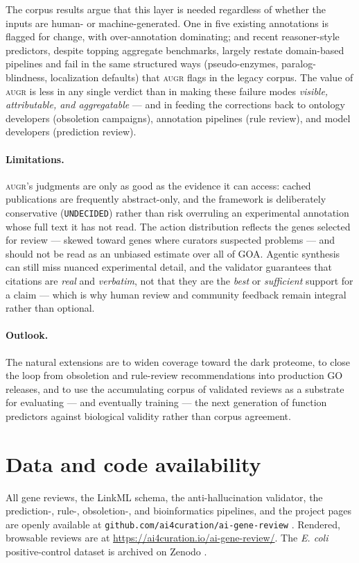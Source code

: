 \documentclass[11pt]{article}
\newcommand{\augr}{\textsc{augr}}
\newcommand{\code}[1]{\texttt{#1}}
\begin{document}
The corpus results argue that this layer is needed regardless of whether the
inputs are human- or machine-generated. One in five existing annotations is
flagged for change, with over-annotation dominating; and recent reasoner-style
predictors, despite topping aggregate benchmarks, largely restate domain-based
pipelines and fail in the same structured ways (pseudo-enzymes, paralog-blindness,
localization defaults) that \augr{} flags in the legacy corpus. The value of
\augr{} is less in any single verdict than in making these failure modes
\emph{visible, attributable, and aggregatable} --- and in feeding the corrections
back to ontology developers (obsoletion campaigns), annotation pipelines (rule
review), and model developers (prediction review).

\paragraph{Limitations.} \augr{}'s judgments are only as good as the evidence it
can access: cached publications are frequently abstract-only, and the framework is
deliberately conservative (\code{UNDECIDED}) rather than risk overruling an
experimental annotation whose full text it has not read. The action distribution
reflects the genes selected for review --- skewed toward genes where curators
suspected problems --- and should not be read as an unbiased estimate over all of
GOA. Agentic synthesis can still miss nuanced experimental detail, and the
validator guarantees that citations are \emph{real} and \emph{verbatim}, not that
they are the \emph{best} or \emph{sufficient} support for a claim --- which is why
human review and community feedback remain integral rather than optional.

\paragraph{Outlook.} The natural extensions are to widen coverage toward the dark
proteome, to close the loop from obsoletion and rule-review recommendations into
production GO releases, and to use the accumulating corpus of validated reviews as
a substrate for evaluating --- and eventually training --- the next generation of
function predictors against biological validity rather than corpus agreement.

\section*{Data and code availability}

All gene reviews, the LinkML schema, the anti-hallucination validator, the
prediction-, rule-, obsoletion-, and bioinformatics pipelines, and the project
pages are openly available at \code{github.com/ai4curation/ai-gene-review}
\cite{aigenereview}. Rendered, browsable reviews are at
\url{https://ai4curation.io/ai-gene-review/}. The \emph{E. coli} positive-control
dataset is archived on Zenodo \cite{mungall2026esrecolidetmini}.



\end{document}
